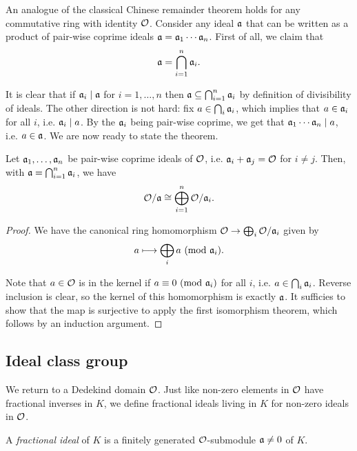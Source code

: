 An analogue of the classical Chinese remainder theorem holds for any commutative ring with identity $\mathcal{O}$. Consider any ideal $\mathfrak{a}$ that can be written as a product of pair-wise coprime ideals $\mathfrak{a}=\mathfrak{a}_1\cdots\mathfrak{a}_n$. First of all, we claim that
\[
	\mathfrak{a} = \bigcap_{i=1}^n \mathfrak{a}_i.
\]

It is clear that if $\mathfrak{a}_i\mid\mathfrak{a}$ for $i=1,\dots,n$ then $\mathfrak{a}\subseteq\bigcap_{i=1}^n \mathfrak{a}_i$ by definition of divisibility of ideals. The other direction is not hard: fix $a\in\bigcap_i\mathfrak{a}_i$, which implies that $a\in\mathfrak{a}_i$ for all $i$, i.e. $\mathfrak{a}_i\mid a$. By the $\mathfrak{a}_i$ being pair-wise coprime, we get that $\mathfrak{a}_1\cdots\mathfrak{a}_n\mid a$, i.e. $a\in\mathfrak{a}$. We are now ready to state the theorem.

\begin{thm}
	Let $\mathfrak{a}_1,\dots,\mathfrak{a}_n$ be pair-wise coprime ideals of $\mathcal{O}$, i.e. $\mathfrak{a}_i+\mathfrak{a}_j=\mathcal{O}$ for $i\neq j$. Then, with $\mathfrak{a}=\bigcap_{i=1}^n\mathfrak{a}_i$, we have
	\[
		\mathcal{O}/\mathfrak{a} \cong \bigoplus_{i=1}^n\mathcal{O}/\mathfrak{a}_i.
	\]
\end{thm}
\begin{proof}
	We have the canonical ring homomorphism $\mathcal{O}\to\bigoplus_i\mathcal{O}/\mathfrak{a}_i$ given by
	\begin{align*}
		a \longmapsto \bigoplus_i a\ (\mathrm{mod}\ \mathfrak{a}_i).
	\end{align*}

	Note that $a\in\mathcal{O}$ is in the kernel if $a\equiv 0\ (\mathrm{mod}\ \mathfrak{a}_i)$ for all $i$, i.e. $a\in\bigcap_i\mathfrak{a}_i$. Reverse inclusion is clear, so the kernel of this homomorphism is exactly $\mathfrak{a}$. It sufficies to show that the map is surjective to apply the first isomorphism theorem, which follows by an induction argument.
\end{proof}



\subsection{Ideal class group}

We return to a Dedekind domain $\mathcal{O}$. Just like non-zero elements in $\mathcal{O}$ have fractional inverses in $K$, we define fractional ideals living in $K$ for non-zero ideals in $\mathcal{O}$.

\begin{defn}
	A \emph{fractional ideal} of $K$ is a finitely generated $\mathcal{O}$-submodule $\mathfrak{a}\neq 0$ of $K$.
\end{defn}

